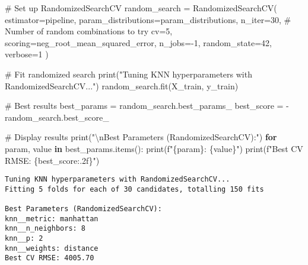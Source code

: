 \documentclass[
  letterpaper,
  DIV=11,
  numbers=noendperiod]{scrreprt}
\newenvironment{Shaded}{\begin{snugshade}}{\end{snugshade}}
\newcommand{\BuiltInTok}[1]{\textcolor[rgb]{0.00,0.23,0.31}{#1}}
\newcommand{\CharTok}[1]{\textcolor[rgb]{0.13,0.47,0.30}{#1}}
\newcommand{\CommentTok}[1]{\textcolor[rgb]{0.37,0.37,0.37}{#1}}
\newcommand{\ControlFlowTok}[1]{\textcolor[rgb]{0.00,0.23,0.31}{\textbf{#1}}}
\newcommand{\DecValTok}[1]{\textcolor[rgb]{0.68,0.00,0.00}{#1}}
\newcommand{\KeywordTok}[1]{\textcolor[rgb]{0.00,0.23,0.31}{\textbf{#1}}}
\newcommand{\NormalTok}[1]{\textcolor[rgb]{0.00,0.23,0.31}{#1}}
\newcommand{\OperatorTok}[1]{\textcolor[rgb]{0.37,0.37,0.37}{#1}}
\newcommand{\SpecialCharTok}[1]{\textcolor[rgb]{0.37,0.37,0.37}{#1}}
\newcommand{\SpecialStringTok}[1]{\textcolor[rgb]{0.13,0.47,0.30}{#1}}
\newcommand{\StringTok}[1]{\textcolor[rgb]{0.13,0.47,0.30}{#1}}
\begin{document}
\begin{Shaded}
\begin{Highlighting}[]
\CommentTok{\# Set up RandomizedSearchCV}
\NormalTok{random\_search }\OperatorTok{=}\NormalTok{ RandomizedSearchCV(}
\NormalTok{    estimator}\OperatorTok{=}\NormalTok{pipeline,}
\NormalTok{    param\_distributions}\OperatorTok{=}\NormalTok{param\_distributions,}
\NormalTok{    n\_iter}\OperatorTok{=}\DecValTok{30}\NormalTok{,  }\CommentTok{\# Number of random combinations to try}
\NormalTok{    cv}\OperatorTok{=}\DecValTok{5}\NormalTok{,}
\NormalTok{    scoring}\OperatorTok{=}\StringTok{\textquotesingle{}neg\_root\_mean\_squared\_error\textquotesingle{}}\NormalTok{,}
\NormalTok{    n\_jobs}\OperatorTok{={-}}\DecValTok{1}\NormalTok{,}
\NormalTok{    random\_state}\OperatorTok{=}\DecValTok{42}\NormalTok{,}
\NormalTok{    verbose}\OperatorTok{=}\DecValTok{1}
\NormalTok{)}
\end{Highlighting}
\end{Shaded}

\begin{Shaded}
\begin{Highlighting}[]
\CommentTok{\# Fit randomized search}
\BuiltInTok{print}\NormalTok{(}\StringTok{"Tuning KNN hyperparameters with RandomizedSearchCV..."}\NormalTok{)}
\NormalTok{random\_search.fit(X\_train, y\_train)}

\CommentTok{\# Best results}
\NormalTok{best\_params }\OperatorTok{=}\NormalTok{ random\_search.best\_params\_}
\NormalTok{best\_score }\OperatorTok{=} \OperatorTok{{-}}\NormalTok{random\_search.best\_score\_}

\CommentTok{\# Display results}
\BuiltInTok{print}\NormalTok{(}\StringTok{"}\CharTok{\textbackslash{}n}\StringTok{Best Parameters (RandomizedSearchCV):"}\NormalTok{)}
\ControlFlowTok{for}\NormalTok{ param, value }\KeywordTok{in}\NormalTok{ best\_params.items():}
    \BuiltInTok{print}\NormalTok{(}\SpecialStringTok{f"}\SpecialCharTok{\{}\NormalTok{param}\SpecialCharTok{\}}\SpecialStringTok{: }\SpecialCharTok{\{}\NormalTok{value}\SpecialCharTok{\}}\SpecialStringTok{"}\NormalTok{)}
\BuiltInTok{print}\NormalTok{(}\SpecialStringTok{f"Best CV RMSE: }\SpecialCharTok{\{}\NormalTok{best\_score}\SpecialCharTok{:.2f\}}\SpecialStringTok{"}\NormalTok{)}
\end{Highlighting}
\end{Shaded}

\begin{verbatim}
Tuning KNN hyperparameters with RandomizedSearchCV...
Fitting 5 folds for each of 30 candidates, totalling 150 fits

Best Parameters (RandomizedSearchCV):
knn__metric: manhattan
knn__n_neighbors: 8
knn__p: 2
knn__weights: distance
Best CV RMSE: 4005.70
\end{verbatim}
\end{document}
